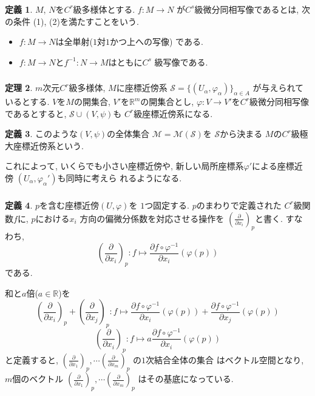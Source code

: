 \documentclass[dvipdfmx,cjk]{beamer}
\theoremstyle{definition}
\newtheorem{dfn}{\textbf{ 定義 }}
\newtheorem{thm}[dfn]{\textbf{ 定理 }}
\begin{document}
\begin{frame}
  \frametitle{}
  \begin{dfn}\label{def:C^s deffeomorphism}
    $M$, $N$を$C^r$級多様体とする. $f:M\to N$
    が$C^s$級微分同相写像であるとは, 次の条件
    (1), (2)を満たすことをいう. 
    \begin{itemize}
        \item[(1)]
        $f:M\to N$は全単射($1$対$1$かつ上への写像)
        である. 
        \item[(2)] 
        $f:M\to N$と$f^{-1}:N\to M$はともに$C^s$
        級写像である. 
    \end{itemize}
\end{dfn}
\end{frame}
\begin{frame}
  \frametitle{}
  \begin{thm}
 $m$次元$C^r$級多様体, $M$に座標近傍系
 $\mathcal{S}=
  \{(U_\alpha, \varphi_\alpha)\}_{\alpha\in A}$
  が与えられているとする. 
  $V$を$M$の開集合, 
  $V'$を$\mathbb{R}^m$の開集合とし,  
  $\varphi:V\to V'$を$C^r$級微分同相写像
  であるとすると, 
  $\mathcal{S}\cup (V,\psi)$も
  $C^r$級座標近傍系になる. 
  \end{thm}

  \begin{dfn}
  このような$(V,\psi)$の全体集合
  $\mathcal{M}=\mathcal{M}(\mathcal{S})$を
  $\mathcal{S}$から決まる
  $M$の$C^r$級極大座標近傍系という.
  \end{dfn}
  これによって, いくらでも小さい座標近傍や, 
  新しい局所座標系$\varphi'$による座標近傍
  $(U_\alpha,\varphi_\alpha')$も同時に考えら
  れるようになる. 
\end{frame}


\begin{frame}
  \frametitle{}
  \begin{dfn}
    $p$を含む座標近傍$(U,\varphi)$を
    $1$つ固定する. $p$のまわりで定義された
    $C^r$級関数$f$に, $p$における$x_i$
    方向の偏微分係数を対応させる操作を
    $\left(\frac{\partial}{\partial x_i}
    \right)_p$と書く. すなわち, 
    $$\left(\frac{\partial}{\partial x_i}
    \right)_p:f\mapsto 
    \frac{\partial f\circ \varphi^{-1}}{\partial x_i}(
      \varphi(p))$$
    である. 
  \end{dfn}
  和と$a$倍($a\in \mathbb{R}$)を
  $$\left(\frac{\partial}{\partial x_i}
  \right)_p+\left(\frac{\partial}{\partial x_j}
  \right)_p:f\mapsto 
  \frac{\partial f\circ \varphi^{-1}}{\partial x_i}(
    \varphi(p))+\frac{\partial f\circ \varphi^{-1}}{\partial x_j}(
      \varphi(p))$$
  $$\left(\frac{\partial}{\partial x_i}
  \right)_p:f\mapsto 
  a\frac{\partial f\circ \varphi^{-1}}{\partial x_i}(
    \varphi(p))$$
  と定義すると, 
  $\left(\frac{\partial}{\partial x_1}\right)_p, 
  \cdots 
  \left(\frac{\partial}{\partial x_m}\right)_p$
  の$1$次結合全体の集合
  はベクトル空間となり, 
  $m$個のベクトル
  $\left(\frac{\partial}{\partial x_1}\right)_p, 
  \cdots 
  \left(\frac{\partial}{\partial x_m}\right)_p$
  はその基底になっている. 
\end{frame}
\end{document}
